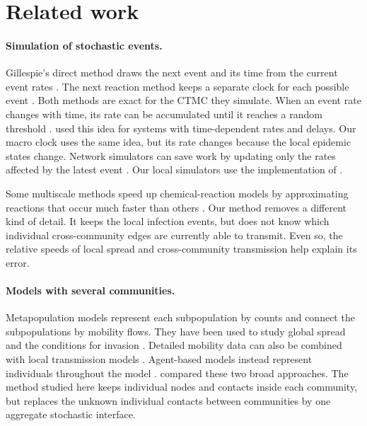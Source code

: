 \clearpage

\section{Related work}
\label{sec:related}

\paragraph{Simulation of stochastic events.}
Gillespie's direct method draws the next event and its time from the current event rates \citep{gillespie1977exact}. The next reaction method keeps a separate clock for each possible event \citep{gibson2000}. Both methods are exact for the CTMC they simulate. When an event rate changes with time, its rate can be accumulated until it reaches a random threshold \citep{ethier1986}. \citet{anderson2007} used this idea for systems with time-dependent rates and delays. Our macro clock uses the same idea, but its rate changes because the local epidemic states change. Network simulators can save work by updating only the rates affected by the latest event \citep{vestergaard2015,kuryliak2025simulating}. Our local simulators use the implementation of \citet{kuryliak2025simulating}.

Some multiscale methods speed up chemical-reaction models by approximating reactions that occur much faster than others \citep{haseltine2002,cao2005slow}. Our method removes a different kind of detail. It keeps the local infection events, but does not know which individual cross-community edges are currently able to transmit. Even so, the relative speeds of local spread and cross-community transmission help explain its error.

\paragraph{Models with several communities.}
Metapopulation models represent each subpopulation by counts and connect the subpopulations by mobility flows. They have been used to study global spread and the conditions for invasion \citep{colizza2007reaction,colizza2008,balcan2009,balcan2010modeling}. Detailed mobility data can also be combined with local transmission models \citep{chang2021}. Agent-based models instead represent individuals throughout the model \citep{eubank2004,kerr2021}. \citet{ajelli2010} compared these two broad approaches. The method studied here keeps individual nodes and contacts inside each community, but replaces the unknown individual contacts between communities by one aggregate stochastic interface.

